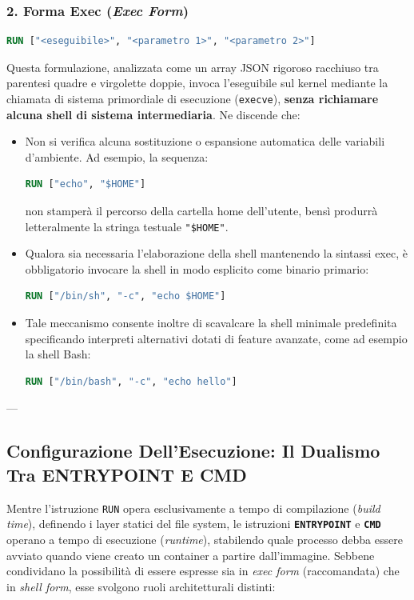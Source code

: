 \documentclass[11pt, a4paper]{article}
\begin{document}
\subsubsection{2. Forma Exec (\emph{Exec Form})}
\begin{lstlisting}[language=dockerfile]
RUN ["<eseguibile>", "<parametro 1>", "<parametro 2>"]
\end{lstlisting}
Questa formulazione, analizzata come un array JSON rigoroso racchiuso tra parentesi quadre e virgolette doppie, invoca l'eseguibile sul kernel mediante la chiamata di sistema primordiale di esecuzione (\texttt{execve}), \textbf{senza richiamare alcuna shell di sistema intermediaria}.
Ne discende che:
\begin{itemize}
    \item Non si verifica alcuna sostituzione o espansione automatica delle variabili d'ambiente. Ad esempio, la sequenza:
\begin{lstlisting}[language=dockerfile]
RUN ["echo", "$HOME"]
\end{lstlisting}
    non stamperà il percorso della cartella home dell'utente, bensì produrrà letteralmente la stringa testuale \texttt{"\$HOME"}.
    \item Qualora sia necessaria l'elaborazione della shell mantenendo la sintassi exec, è obbligatorio invocare la shell in modo esplicito come binario primario:
\begin{lstlisting}[language=dockerfile]
RUN ["/bin/sh", "-c", "echo $HOME"]
\end{lstlisting}
    \item Tale meccanismo consente inoltre di scavalcare la shell minimale predefinita specificando interpreti alternativi dotati di feature avanzate, come ad esempio la shell Bash:
\begin{lstlisting}[language=dockerfile]
RUN ["/bin/bash", "-c", "echo hello"]
\end{lstlisting}
\end{itemize}

---

\subsection{Configurazione Dell'Esecuzione: Il Dualismo Tra ENTRYPOINT E CMD}

Mentre l'istruzione \texttt{RUN} opera esclusivamente a tempo di compilazione (\emph{build time}), definendo i layer statici del file system, le istruzioni \textbf{\texttt{ENTRYPOINT}} e \textbf{\texttt{CMD}} operano a tempo di esecuzione (\emph{runtime}), stabilendo quale processo debba essere avviato quando viene creato un container a partire dall'immagine. Sebbene condividano la possibilità di essere espresse sia in \emph{exec form} (raccomandata) che in \emph{shell form}, esse svolgono ruoli architetturali distinti:
\end{document}
